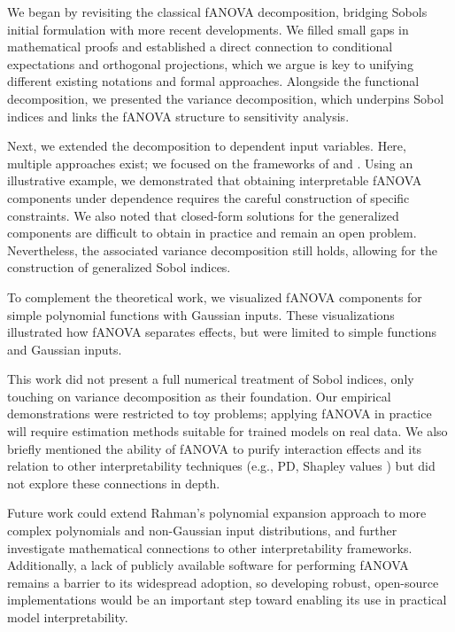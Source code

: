 We began by revisiting the classical fANOVA decomposition, bridging Sobols initial formulation with more recent developments. We filled small gaps in mathematical proofs and established a direct connection to conditional expectations and orthogonal projections, which we argue is key to unifying different existing notations and formal approaches. Alongside the functional decomposition, we presented the variance decomposition, which underpins Sobol indices and links the fANOVA structure to sensitivity analysis.\par

Next, we extended the decomposition to dependent input variables. Here, multiple approaches exist; we focused on the frameworks of \cite{hooker2007} and \cite{rahman2014}.
Using an illustrative example, we demonstrated that obtaining interpretable fANOVA components under dependence requires the careful construction of specific constraints. We also noted that closed-form solutions for the generalized components are difficult to obtain in practice and remain an open problem. Nevertheless, the associated variance decomposition still holds, allowing for the construction of generalized Sobol indices.\par

To complement the theoretical work, we visualized fANOVA components for simple polynomial functions with Gaussian inputs. These visualizations illustrated how fANOVA separates effects, but were limited to simple functions and Gaussian inputs.\par

This work did not present a full numerical treatment of Sobol indices, only touching on variance decomposition as their foundation. Our empirical demonstrations were restricted to toy problems; applying fANOVA in practice will require estimation methods suitable for trained models on real data. We also briefly mentioned the ability of fANOVA to purify interaction effects \citep{lengerich2020} and its relation to other interpretability techniques (e.g., PD, Shapley values \citep{fumagalli2025}) but did not explore these connections in depth.\par

Future work could extend Rahman’s polynomial expansion approach to more complex polynomials and non-Gaussian input distributions, and further investigate mathematical connections to other interpretability frameworks.
Additionally, a lack of publicly available software for performing fANOVA remains a barrier to its widespread adoption, so developing robust, open-source implementations would be an important step toward enabling its use in practical model interpretability.

